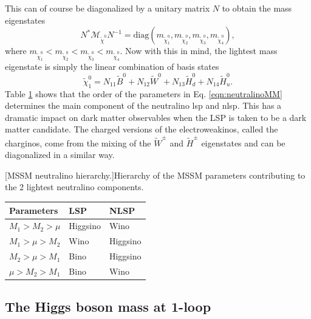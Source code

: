 This can of course be diagonalized by a unitary matrix $N$ to obtain the mass eigenstates %
\begin{equation}
N^* \mathcal{M}_{\tilde{\chi}^0} N^{-1} = \text{diag}(m_{\tilde{\chi}^0_1},m_{\tilde{\chi}^0_2},m_{\tilde{\chi}^0_3},m_{\tilde{\chi}^0_4}),
\end{equation}
where $m_{\tilde{\chi}^0_1}<m_{\tilde{\chi}^0_2}<m_{\tilde{\chi}^0_3}<m_{\tilde{\chi}^0_4}$.
Now with this in mind, the lightest mass eigenstate is simply the linear combination of basis states
\begin{equation}
\tilde{\chi}^0_1 = N_{11} \tilde{B}^0 + N_{12} \tilde{W}^0 + N_{13} \tilde{H}^0_d + N_{14} \tilde{H}^0_u.
\end{equation}
Table \ref{tab:LSP} shows that the order of the parameters in Eq. \ref{eqn:neutralinoMM} determines the main component of the neutralino \acrshort{lsp} and \acrshort{nlsp}. This has a dramatic impact on dark matter observables when the LSP is taken to be a dark matter candidate. The charged versions of the electroweakinos, called the charginos, come from the mixing of the $\tilde{W}^{\pm}$ and $\tilde{H}^{\pm}$ eigenstates and can be diagonalized in a similar way.
\begin{table}[]
[MSSM neutralino hierarchy.]{Hierarchy of the MSSM parameters contributing to the 2 lightest neutralino components.}
\label{tab:LSP}
\centering
\begin{tabular}{|l|l|l|}
\hline
Parameters                                & \textbf{LSP} & \textbf{NLSP} \\ \hline
\textit{$M_1 > M_2 > \mu$}                & Higgsino     & Wino          \\ \hline
\textit{$M_1 > \mu > M_2$}                & Wino         & Higgsino      \\ \hline
\textit{$M_2 > \mu > M_1$}                & Bino         & Higgsino      \\ \hline
\textit{$ \mu > M_2 > M_1$}               & Bino         & Wino          \\ \hline
\end{tabular}
\end{table}

\subsection{The Higgs boson mass at 1-loop}
\label{subsec:MSSMhiggssec}

